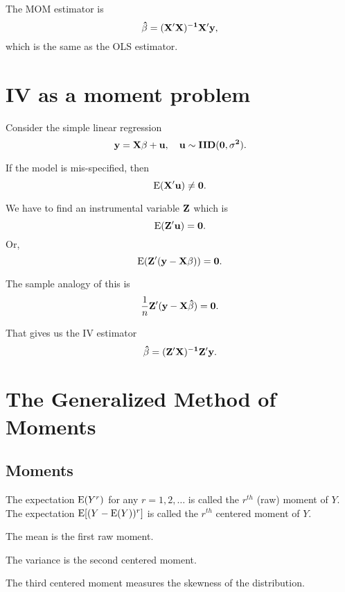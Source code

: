 The MOM estimator is
\begin{equation}
\bf \hat \beta=(X'X)^{-1}X'y,
\end{equation}
which is the same as the OLS estimator.

\section{IV as a moment problem}
Consider the simple linear regression
\begin{equation}
\bf y=X\beta+u, \quad u \sim IID(0, \sigma^2).
\end{equation}

If the model is mis-specified, then
\begin{equation}
\rm E (\bf X'u)\neq 0.
\end{equation}

We have to find an instrumental variable $\bf Z$ which is
\begin{equation}
\rm E (\bf Z'u)= 0.
\end{equation}
Or,
\begin{equation}
\rm E (\bf Z'(y-X\beta))= 0.
\end{equation}

The sample analogy of this is
\begin{equation}
\frac{1}{n} \bf Z'(y-X \hat \beta)=0.
\end{equation}

That gives us the IV estimator
\begin{equation}
\bf \hat \beta=(Z'X)^{-1}Z'y.
\end{equation}

\section{The Generalized Method of Moments}

\subsection{Moments}

The expectation ${\rm E}(Y^r)$ for any $r=1,2, \dots$ is called the
$r^{th}$ (raw) moment of $Y$.  The expectation ${\rm E} [(Y-{\rm
  E}(Y))^r]$ is called the $r^{th}$ centered moment of $Y$.

The mean is the first raw moment.

The variance is the second centered moment.

The third centered moment measures the skewness of the
distribution.

